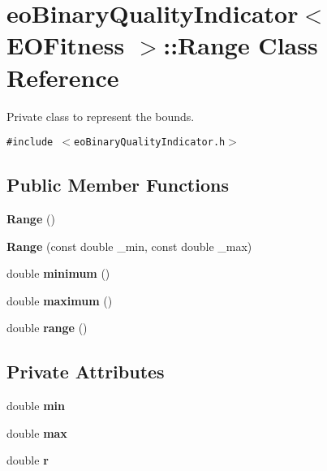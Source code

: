 \section{eo\-Binary\-Quality\-Indicator$<$ EOFitness $>$::Range Class Reference}
\label{classeoBinaryQualityIndicator_1_1Range}
Private class to represent the bounds.  


{\tt \#include $<$eo\-Binary\-Quality\-Indicator.h$>$}

\subsection*{Public Member Functions}
\begin{CompactItemize}
\item 
{\bf Range} ()\label{classeoBinaryQualityIndicator_1_1Range_75dfd77019095fa4993ad3187ac44006}

\item 
{\bf Range} (const double \_\-min, const double \_\-max)\label{classeoBinaryQualityIndicator_1_1Range_111b9a6b682bd0270039cce7d1a847ca}

\item 
double {\bf minimum} ()\label{classeoBinaryQualityIndicator_1_1Range_f9554f81819461f9ad56c12a93259803}

\item 
double {\bf maximum} ()\label{classeoBinaryQualityIndicator_1_1Range_790f08b55cdd69213886de198b2bcc5f}

\item 
double {\bf range} ()\label{classeoBinaryQualityIndicator_1_1Range_a432e7dbdb691ce4e6ee6d6a224e469f}

\end{CompactItemize}
\subsection*{Private Attributes}
\begin{CompactItemize}
\item 
double {\bf min}\label{classeoBinaryQualityIndicator_1_1Range_e233e32a9b7cb73ef5dbe06a204482ec}

\item 
double {\bf max}\label{classeoBinaryQualityIndicator_1_1Range_63c9473e163e3c0c6d5a0327252786b1}

\item 
double {\bf r}\label{classeoBinaryQualityIndicator_1_1Range_101eaf7a60e7243df169c7fde6087342}

\end{CompactItemize}


